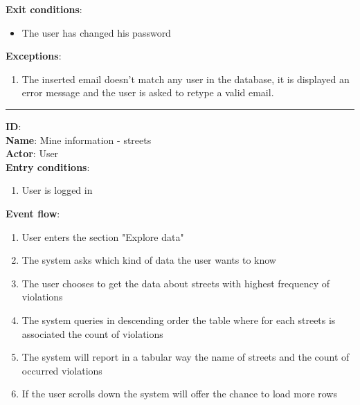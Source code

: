 \begin{enumerate}
\begin{itemize}
\begin{enumerate}
		\end{enumerate}
		\textbf{Exit conditions}:
		\begin{itemize}
			\item{The user has changed his password}
		\end{itemize}
		\textbf{Exceptions}:
		\begin{enumerate}
      		\item{The inserted email doesn't match any user in the database, it is displayed an error message and the user is asked to retype a valid email.}
 		   \end{enumerate}
		\rule{\linewidth}{0.4pt}
		\textbf{ID}:  \\
		\textbf{Name}: Mine information - streets \\
		\textbf{Actor}: User  \\
		\textbf{Entry conditions}:
		\begin{enumerate}
			\item{User is logged in}
		\end{enumerate}
		\textbf{Event flow}:
		\begin{enumerate}
			\item{User enters the section "Explore data"}
			\item{The system asks which kind of data the user wants to know}
      \item{The user chooses to get the data about streets with highest frequency of violations}
      \item{The system queries in descending order the table where for each streets is associated the count of violations }
      \item{The system will report in a tabular way the name of streets and the count of occurred violations}
      \item{If the user scrolls down the system will offer the chance to load more rows}
		\end{enumerate}
		

\end{itemize}
\end{enumerate}
